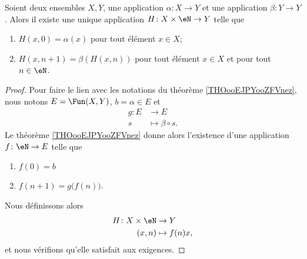 \begin{corollary}       \label{CORooVNHKooRkKtXf}
	Soient deux ensembles \( X,Y\), une application \( \alpha\colon X\to Y\) et une application \( \beta\colon Y\to Y\). Alors il existe une unique application \( H\colon X\times \eN\to Y\) telle que
	\begin{enumerate}
		\item
		      \( H(x , 0)   = \alpha(x)\)   pour tout élément \( x\in X\);
		\item
		      \( H(x , n+1) = \beta( H( x , n) )\) pour tout élément \( x\in X\) et pour tout \( n\in \eN\).
	\end{enumerate}
\end{corollary}

\begin{proof}
	Pour faire le lien avec les notations du théorème \ref{THOooEJPYooZFVnez}, nous notons \( E=\Fun(X,Y)\), \( b=\alpha\in E\) et
	\begin{equation}
		\begin{aligned}
			g\colon E & \to E                 \\
			s         & \mapsto \beta\circ s.
		\end{aligned}
	\end{equation}
	Le théorème \ref{THOooEJPYooZFVnez} donne alors l'existence d'une application \( f\colon \eN\to E\) telle que
	\begin{enumerate}
		\item
		      \( f(0)=b\)
		\item
		      \( f(n+1)=g\big( f(n) \big)\).
	\end{enumerate}
	Nous définissons alors
	\begin{equation}
		\begin{aligned}
			H\colon X\times \eN & \to Y          \\
			(x,n)               & \mapsto f(n)x,
		\end{aligned}
	\end{equation}
	et nous vérifions qu'elle satisfait aux exigences.


\end{proof}
